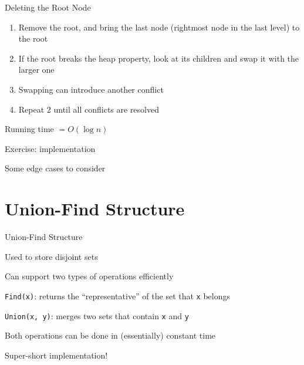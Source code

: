 \documentclass[13pt,onlymath]{beamer}
\begin{document}
\begin{frame}[fragile]{Deleting the Root Node}
\begin{enumerate}
\item Remove the root, and bring the last node (rightmost node in the last level) to the root
\item If the root breaks the heap property, look at its children and swap it with the larger one
\BIT
\item Swapping can introduce another conflict
\EIT
\item Repeat 2 until all conflicts are resolved
\end{enumerate}
\BIT
\item Running time $= O(\log n)$
\item Exercise: implementation
\BIT
\item Some edge cases to consider
\EIT
\EIT
\end{frame}


\section{Union-Find Structure}

\begin{frame}[fragile]{Union-Find Structure}
\BIT
\item Used to store disjoint sets
\item Can support two types of operations efficiently
\BIT
\item \verb,Find(x),: returns the ``representative'' of the set that \verb,x, belongs
\item \verb.Union(x, y).: merges two sets that contain \verb,x, and \verb,y,
\EIT
\vfill
\item Both operations can be done in (essentially) constant time
\item Super-short implementation!
\EIT
\end{frame}
\end{document}
